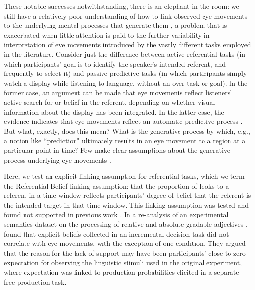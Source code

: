 \documentclass[10pt,letterpaper]{article}
\begin{document}
These notable successes notwithstanding, there is an elephant in the room: we still have a relatively poor understanding of how to link observed eye movements to the underlying mental processes that generate them \cite{SalverdaTanenhaus2017:The-Visual-World-Paradigm, tanenhaus2000eye, Allopenna1998, magnuson2019fixations}, a problem that is exacerbated when little attention is paid to the further variability in interpretation of eye movements introduced by the vastly different tasks employed in the literature. Consider just the difference between active referential tasks (in which participants' goal is to identify the speaker's intended referent, and frequently to select it) and passive predictive tasks (in which participants simply watch a display while listening to language, without an over task or goal). In the former case, an argument can be made that eye movements reflect listeners' active search for or belief in the referent, depending on whether visual information about the display has been integrated. In the latter case, the evidence indicates that eye movements reflect an automatic predictive process \cite{altmann1999}. But what, exactly, does this mean? What is the generative process by which, e.g., a notion like ``prediction" ultimately results in an eye movement to a region at a particular point in time? Few make clear assumptions about the generative process underlying eye movements \cite<but for a principled early example, see >{Allopenna1998}.

Here, we test an explicit linking assumption for referential tasks, which we term the Referential Belief linking assumption: that the proportion of looks to a referent in a time window reflects participants' degree of belief that the referent is the intended target in that time window. This linking assumption was tested and found not supported in previous work \cite{QingLD2018}. In a re-analysis of an experimental semantics dataset on the processing of relative and absolute gradable adjectives \cite{LeffelXiangKennedy2016:Imprecision-is-Pragmatic-},  found that explicit beliefs collected in an incremental decision task \cite<similar to gating tasks,>{Allopenna1998} did not correlate with eye movements, with the exception of one condition. They argued that the reason for the lack of support may have been participants' close to zero expectation  for observing the linguistic stimuli used in the original experiment, where expectation was linked to production probabilities elicited in a separate free production task.
\end{document}
